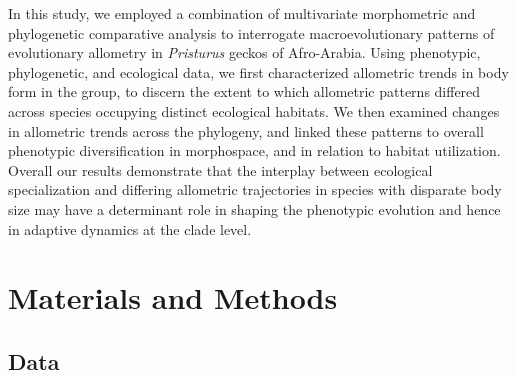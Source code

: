 \documentclass[
  11pt,
]{article}
\begin{document}
In this study, we employed a combination of multivariate morphometric
and phylogenetic comparative analysis to interrogate macroevolutionary
patterns of evolutionary allometry in \emph{Pristurus} geckos of
Afro-Arabia. Using phenotypic, phylogenetic, and ecological data, we
first characterized allometric trends in body form in the group, to
discern the extent to which allometric patterns differed across species
occupying distinct ecological habitats. We then examined changes in
allometric trends across the phylogeny, and linked these patterns to
overall phenotypic diversification in morphospace, and in relation to
habitat utilization. Overall our results demonstrate that the interplay
between ecological specialization and differing allometric trajectories
in species with disparate body size may have a determinant role in
shaping the phenotypic evolution and hence in adaptive dynamics at the
clade level.

\hypertarget{materials-and-methods}{%
\section{Materials and Methods}\label{materials-and-methods}}

\hypertarget{data}{%
\subsection{Data}\label{data}}
\end{document}
